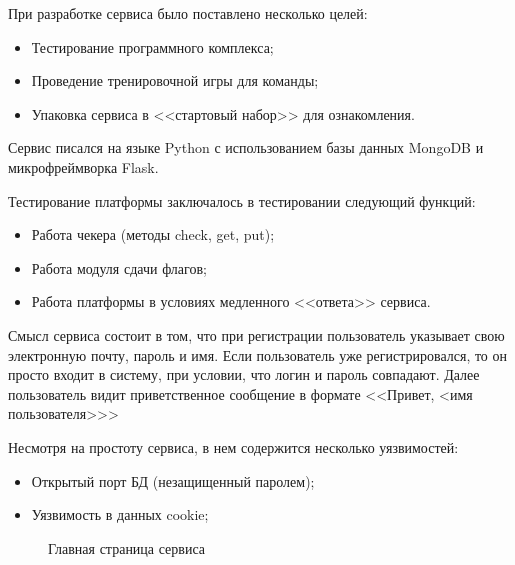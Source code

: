 При разработке сервиса было поставлено несколько целей:
\begin{itemize} 
\item Тестирование программного комплекса;
\item Проведение тренировочной игры для команды;
\item Упаковка сервиса в <<стартовый набор>> для ознакомления.
\end{itemize}

Сервис писался на языке Python с использованием базы данных MongoDB и микрофреймворка Flask.

Тестирование платформы заключалось в тестировании следующий функций:
\begin{itemize} 
\item Работа чекера (методы check, get, put);
\item Работа модуля сдачи флагов;
\item Работа платформы в условиях медленного <<ответа>> сервиса.
\end{itemize}

Смысл сервиса состоит в том, что при регистрации пользователь указывает свою электронную почту, пароль и имя.
Если пользователь уже регистрировался, то он просто входит в систему, при условии, что логин и пароль  совпадают. Далее пользователь видит приветственное сообщение в формате <<Привет, <имя пользователя>>>

Несмотря на простоту сервиса, в нем содержится несколько уязвимостей:
\begin{itemize} 
\item Открытый порт БД (незащищенный паролем);
\item Уязвимость в данных cookie;
\end{itemize}

\begin{figure}[ht!]
\caption{Главная страница сервиса}
\end{figure} 
